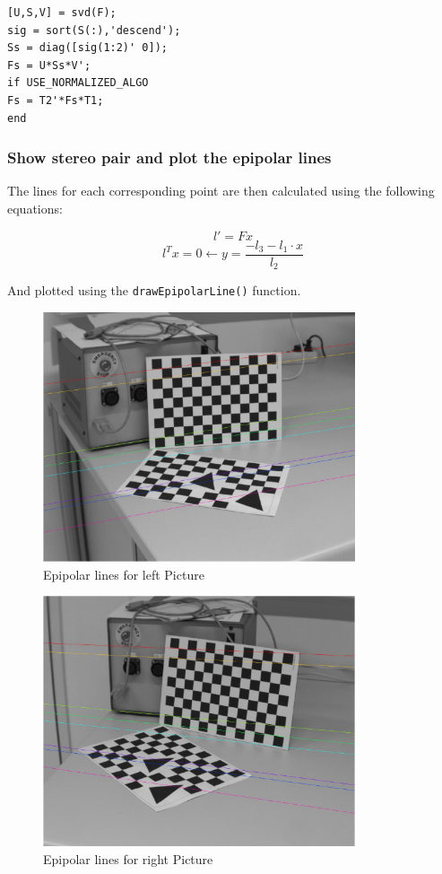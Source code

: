 \documentclass[
a4paper,     %
11pt         %
]{scrartcl}  %
\begin{document}
\begin{lstlisting}[label=lst:constraint, caption=Matlab script for imposing rank 2 constraint]
[U,S,V] = svd(F);
sig = sort(S(:),'descend');
Ss = diag([sig(1:2)' 0]);
Fs = U*Ss*V';
if USE_NORMALIZED_ALGO
Fs = T2'*Fs*T1;
end
\end{lstlisting}

\subsubsection{Show stereo pair and plot the epipolar lines}

The lines for each corresponding point are then calculated using the following equations:

$$ l' = F x $$
$$ l^T x = 0 \leftarrow y = \frac{-l_3 - l_1 \cdot x}{l_2} $$

And plotted using the \lstinline{drawEpipolarLine()} function.

\begin{figure}
 \centering
 \includegraphics[width=0.82\textwidth]{left_lines.jpg}
 \caption{Epipolar lines for left Picture}
 \label{fig:left_lines}
\end{figure}


\begin{figure}
 \centering
 \includegraphics[width=0.82\textwidth]{right_lines.jpg}
 \caption{Epipolar lines for right Picture}
 \label{fig:right_lines}
\end{figure}
\end{document}
